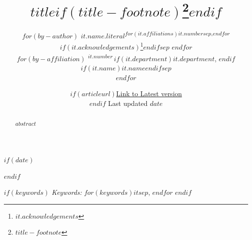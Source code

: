 %

\def\spacingset#1{\renewcommand{\baselinestretch}%
{#1}\small\normalsize} \spacingset{1}

$if(date)$
\date{$if(articleurl)$\href{$articleurl$}{Link to Latest version}\\ \vspace{1em} $endif$ Last updated $date$}
$endif$

\title{$title$$if(title-footnote)$\thanks{$title-footnote$}$endif$}

\author{%
$for(by-author)$
  $it.name.literal$\textsuperscript{$for(it.affiliations)$$it.number$$sep$,$endfor$}$if(it.acknowledgements)$\thanks{$it.acknowledgements$}$endif$$sep$ \quad
$endfor$
  \\[0.6em]
  \normalsize
$for(by-affiliation)$
  \textsuperscript{$it.number$}\,$if(it.department)$$it.department$, $endif$$if(it.name)$$it.name$$endif$$sep$\\
$endfor$
}

\maketitle

\bigskip
\bigskip
\begin{abstract}
$abstract$
\end{abstract}

\bigskip
$if(keywords)$
\noindent%
{\it Keywords:} $for(keywords)$$it$$sep$, $endfor$
\vfill
$endif$

\newpage
\spacingset{1.2} %
